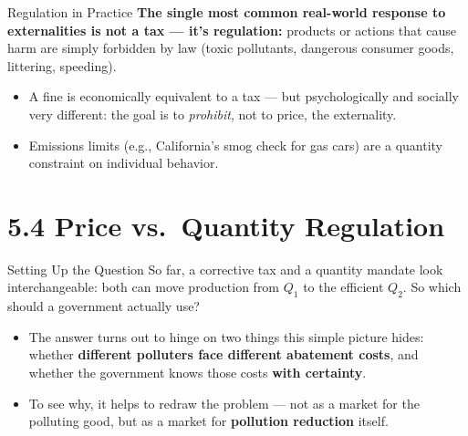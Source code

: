 \documentclass[11pt,aspectratio=169]{beamer}
\begin{document}
\begin{frame}{Regulation in Practice}
  \textbf{The single most common real-world response to externalities is not a tax --- it's regulation:} products or actions that cause harm are simply forbidden by law (toxic pollutants, dangerous consumer goods, littering, speeding).
  \begin{itemize}
    \item A fine is economically equivalent to a tax --- but psychologically and socially very different: the goal is to \emph{prohibit}, not to price, the externality.
    \item Emissions limits (e.g., California's smog check for gas cars) are a quantity constraint on individual behavior.
  \end{itemize}

\end{frame}

\section{5.4 Price vs.\ Quantity Regulation}

\begin{frame}{Setting Up the Question}
  So far, a corrective tax and a quantity mandate look interchangeable: both can move production from $Q_1$ to the efficient $Q_2$. So which should a government actually use?
  \begin{itemize}
    \item The answer turns out to hinge on two things this simple picture hides: whether \textbf{different polluters face different abatement costs}, and whether the government knows those costs \textbf{with certainty}.
    \item To see why, it helps to redraw the problem --- not as a market for the polluting good, but as a market for \textbf{pollution reduction} itself.
  \end{itemize}
\end{frame}
\end{document}
